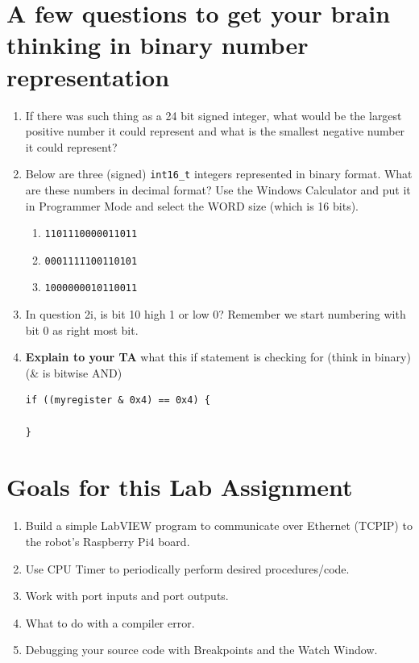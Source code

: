 \documentclass[11pt]{article}
\begin{document}
\MakeAssignmentTitle

\section*{A few questions to get your brain thinking in binary number representation}
%
\begin{enumerate}
    \item If there was such thing as a 24 bit signed integer, what would be the largest positive number it could represent and what is the smallest negative number it could represent?
        \item Below are three (signed) \texttt{int16_t} integers represented in binary format. What are these numbers in decimal format? Use the Windows Calculator and put it in Programmer Mode and select the WORD size (which is 16 bits).
        \begin{enumerate}
            \item \texttt{1101110000011011}
            \item \texttt{0001111100110101}
            \item \texttt{1000000010110011}
        \end{enumerate}
    \item In question 2i, is bit 10 high 1 or low 0? Remember we start numbering with bit 0 as right most bit.
    \item \leavevmode
        \begin{checkoff}
                \textbf{Explain to your TA} what this if statement is checking for (think in binary) (\& is bitwise AND)
\begin{verbatim}
if ((myregister & 0x4) == 0x4) {

}
\end{verbatim}
        \end{checkoff}
\end{enumerate}
%
\section*{Goals for this Lab Assignment}
%
\begin{enumerate}
    \item Build a simple LabVIEW program to communicate over Ethernet (TCPIP) to the robot’s Raspberry Pi4 board.
    \item Use CPU Timer to periodically perform desired procedures/code.
    \item Work with port inputs and port outputs.
    \item What to do with a compiler error.
    \item Debugging your source code with Breakpoints and the Watch Window.
\end{enumerate}
%
\end{document}
